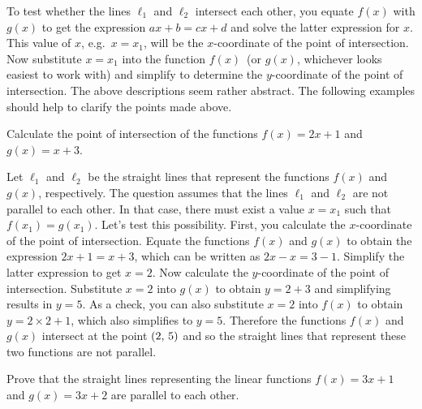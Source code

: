 \documentclass[a4paper,oneside,12pt]{article}
\begin{document}
To test whether the lines $\ell_1$ and $\ell_2$ intersect each other,
you equate $f(x)$ with $g(x)$ to get the expression $ax + b = cx + d$
and solve the latter expression for $x$.  This value of $x$,
e.g.~$x = x_1$, will be the $x$-coordinate of the point of
intersection.  Now substitute $x = x_1$ into the function $f(x)$~(or
$g(x)$, whichever looks easiest to work with) and simplify to
determine the $y$-coordinate of the point of intersection.  The above
descriptions seem rather abstract.  The following examples should help
to clarify the points made above.

\begin{example}
Calculate the point of intersection of the functions $f(x) = 2x + 1$
and $g(x) = x + 3$.
\end{example}

\begin{solution}
Let $\ell_1$ and $\ell_2$ be the straight lines that represent the
functions $f(x)$ and $g(x)$, respectively.  The question assumes that
the lines $\ell_1$ and $\ell_2$ are not parallel to each other.  In
that case, there must exist a value $x = x_1$ such that
$f(x_1) = g(x_1)$.  Let's test this possibility.  First, you calculate
the $x$-coordinate of the point of intersection.  Equate the functions
$f(x)$ and $g(x)$ to obtain the expression $2x + 1 = x + 3$, which can
be written as $2x - x = 3 - 1$.  Simplify the latter expression to get
$x = 2$.  Now calculate the $y$-coordinate of the point of
intersection.  Substitute $x = 2$ into $g(x)$ to obtain $y = 2 + 3$
and simplifying results in $y = 5$.  As a check, you can also
substitute $x = 2$ into $f(x)$ to obtain $y = 2 \times 2 + 1$, which
also simplifies to $y = 5$.  Therefore the functions $f(x)$ and $g(x)$
intersect at the point $\left\lparen{2},\, {5}\right\rparen$ and so the straight lines that
represent these two functions are not parallel.
\end{solution}

\begin{example}
Prove that the straight lines representing the linear functions
$f(x) = 3x + 1$ and $g(x) = 3x + 2$ are parallel to each other.
\end{example}
\end{document}

